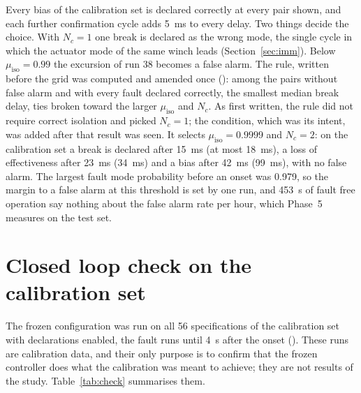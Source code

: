 \documentclass[10pt]{article}
\begin{document}
Every bias of the calibration set is declared correctly at every pair shown, and each further confirmation cycle adds 5~ms to every delay. Two things decide the choice. With $N_c=1$ one break is declared as the wrong mode, the single cycle in which the actuator mode of the same winch leads (Section~\ref{sec:imm}). Below $\mu_{\mathrm{iso}}=0.99$ the excursion of run 38 becomes a false alarm. The rule, written before the grid was computed and amended once (): among the pairs without false alarm and with every fault declared correctly, the smallest median break delay, ties broken toward the larger $\mu_{\mathrm{iso}}$ and $N_c$. As first written, the rule did not require correct isolation and picked $N_c=1$; the condition, which was its intent, was added after that result was seen. It selects $\mu_{\mathrm{iso}}=0.9999$ and $N_c=2$: on the calibration set a break is declared after 15~ms (at most 18~ms), a loss of effectiveness after 23~ms (34~ms) and a bias after 42~ms (99~ms), with no false alarm. The largest fault mode probability before an onset was 0.979, so the margin to a false alarm at this threshold is set by one run, and 453~s of fault free operation say nothing about the false alarm rate per hour, which Phase~5 measures on the test set.

\section{Closed loop check on the calibration set}\label{sec:check}

The frozen configuration was run on all 56 specifications of the calibration set with declarations enabled, the fault runs until 4~s after the onset (). These runs are calibration data, and their only purpose is to confirm that the frozen controller does what the calibration was meant to achieve; they are not results of the study. Table~\ref{tab:check} summarises them.
\end{document}
